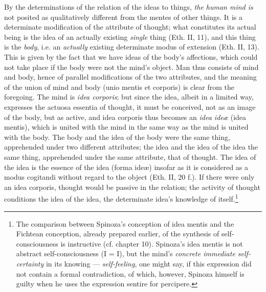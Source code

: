 \documentclass[12pt,a4paper,openany]{book}
\begin{document}
By the determinations of the relation of the ideas to things, \emph{the human
mind is} not posited as qualitatively different
from the mentes of other things. It is a determinate modification of
the attribute of thought; what constitutes its actual
being is the idea of an actually existing \emph{single} thing (Eth.
II, 11), and this thing is the \emph{body}, i.e. an \emph{actually}
existing determinate modus of extension (Eth. II, 13). This is
given by the fact that we have ideas of the body's affections,
which could not take place if the body were not the mind's
object. Man thus consists of mind and body, hence
of parallel modifications of the two attributes, and the
meaning of the union of mind and body (unio mentis et
corporis) is clear from the foregoing. The mind is \emph{idea corporis};
but since the idea, albeit in a limited way, expresses the
actuosa essentia of thought, it must be conceived, not as an
image of the body, but as active, and idea corporis thus
becomes an \emph{idea ideæ} (idea mentis), which is united with the mind
in the same way as the mind is united with the body.
The body and the idea of the body were the same thing, apprehended under two
different attributes; the idea and the idea of the idea the same thing,
apprehended under the same attribute, that of thought. The idea of the idea is
the essence of the idea (forma ideæ) insofar as it is considered as a
modus cogitandi without regard to the object (Eth. II, 20 f.).
If there were only an idea corporis, thought would be passive in
the relation; the activity of thought conditions the idea of the idea, the
determinate idea's knowledge of itself.\footnote{The comparison
between Spinoza's conception of idea mentis and the Fichtean
conception, already prepared earlier, of the synthesis of self-consciousness
is instructive (cf. chapter 10). Spinoza's idea mentis is
not abstract self-consciousness (I = I), but the mind's
\emph{concrete immediate self-certainty} in its knowing ---
\emph{self-feeling}, one might say, if this expression did not
contain a formal contradiction, of which, however, Spinoza himself
is guilty when he uses the expression sentire for percipere.}
\end{document}
